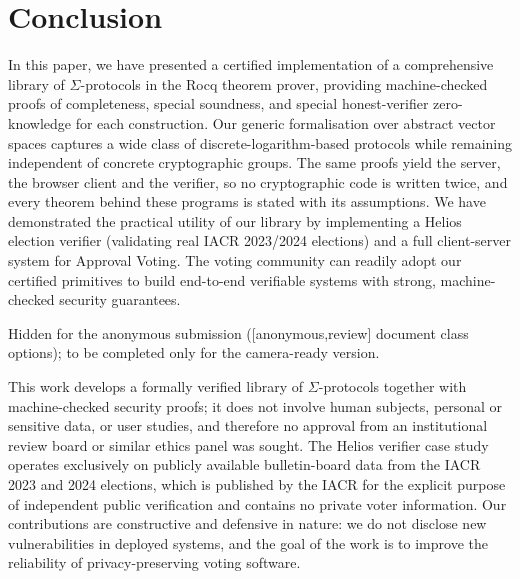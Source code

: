 \documentclass[sigconf,anonymous,review]{acmart}
\begin{document}
\section{Conclusion}
   In this paper, we have presented a certified implementation of a comprehensive library of $\Sigma$-protocols in the Rocq theorem prover, providing machine-checked proofs of completeness, special soundness, and special honest-verifier zero-knowledge for each construction. Our generic formalisation over abstract vector spaces captures a wide class of discrete-logarithm-based protocols while remaining independent of concrete cryptographic groups. The same proofs yield the server, the browser client and the verifier, so no cryptographic code is written twice, and every theorem behind these programs is stated with its assumptions. We have demonstrated the practical utility of our library by implementing a Helios election verifier (validating real IACR 2023/2024 elections) and a full client-server system for Approval Voting. The voting community can readily adopt our certified primitives to build end-to-end verifiable systems with strong, machine-checked security guarantees.





\appendix

\begin{acks}
Hidden for the anonymous submission ([anonymous,review] document class
options); to be completed only for the camera-ready version.
\end{acks}

\begin{ethics}
This work develops a formally verified library of $\Sigma$-protocols together
with machine-checked security proofs; it does not involve human subjects,
personal or sensitive data, or user studies, and therefore no approval from an
institutional review board or similar ethics panel was sought. The Helios
verifier case study operates exclusively on publicly available
bulletin-board data from the IACR 2023 and 2024 elections, which is published
by the IACR for the explicit purpose of independent public verification and
contains no private voter information. Our contributions are constructive and
defensive in nature: we do not disclose new vulnerabilities in deployed
systems, and the goal of the work is to improve the reliability of
privacy-preserving voting software.
\end{ethics}
\end{document}
